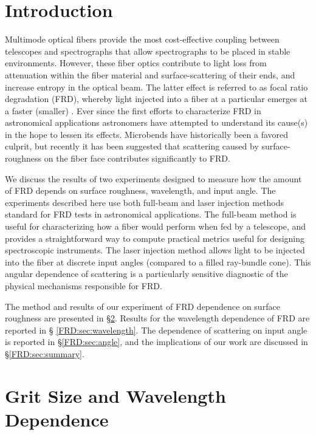 \section{Introduction}

Multimode optical fibers provide the most cost-effective coupling
between telescopes and spectrographs that allow spectrographs to be
placed in stable environments. However, these fiber optics contribute
to light loss from attenuation within the fiber material and
surface-scattering of their ends, and increase entropy in the optical
beam. The latter effect is referred to as focal ratio degradation
(FRD), whereby light injected into a fiber at a particular \fratio
emerges at a faster (smaller) \fratio. Ever since the first efforts to
characterize FRD in astronomical applications\cite{Angel77}
astronomers have attempted to understand its cause(s) in the hope to
lessen its effects\cite{Carrasco,Oliveira}. Microbends have
historically been a favored culprit\cite{Carrasco,Gloge72}, but
recently it has been suggested\cite{Haynes11, Avila98} that scattering
caused by surface-roughness on the fiber face contributes
significantly to FRD.

We discuss the results of two experiments designed to measure how the
amount of FRD depends on surface roughness, wavelength, and input
angle. The experiments described here use both full-beam and laser
injection methods\cite{Carrasco} standard for FRD tests in
astronomical applications. The full-beam method is useful for
characterizing how a fiber would perform when fed by a telescope,
and provides a straightforward way to compute practical metrics useful
for designing spectroscopic instruments. The laser injection method
allows light to be injected into the fiber at discrete input angles
(compared to a filled ray-bundle cone). This angular dependence of
scattering is a particularly sensitive diagnostic of the physical
mechanisms responsible for FRD.

The method and results of our experiment of FRD dependence on surface
roughness are presented in \S \ref{FRD:sec:polish}. Results for the
wavelength dependence of FRD are reported in \S
\ref{FRD:sec:wavelength}. The dependence of scattering on input angle is
reported in \S \ref{FRD:sec:angle}, and the implications of our work are
discussed in \S \ref{FRD:sec:summary}.

\section{Grit Size and Wavelength Dependence}
\label{FRD:sec:polish}
